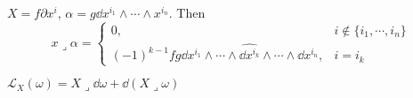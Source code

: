 \begin{example}
     $ X=f\partial x^i $,  $ \alpha=g\dd x^{i_1}\wedge\cdots\wedge x^{i_n} $. Then 
     \begin{equation}
        x\mathrel{\lrcorner}\alpha=\begin{cases}
            0,&i\not\in\{i_1,\cdots,i_n\}\\
            (-1)^{k-1}fg\dd x^{i_1}\wedge\cdots\wedge\widehat{\dd x^{i_k}}\wedge\cdots\wedge \dd x^{i_n},&i=i_k
         \end{cases}\label{eq:Easy calculation of the Cartan's binary operator}
     \end{equation}
\end{example}
\begin{theorem}\label{thm:Cartan's Magical Formula}
     $ \mathcal{L}_X(\omega)=X\mathrel{\lrcorner}\dd \omega+\dd(X\mathrel{\lrcorner}\omega) $ 
\end{theorem}
